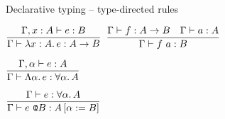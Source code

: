 \documentclass{beamer}
\begin{document}
\begin{frame}{Declarative typing -- type-directed rules}

\begin{center}
  $\displaystyle \frac{\Gamma, x : A \vdash e : B}{\Gamma \vdash \lambda x : A.\, e : A \to B} \textsc{\footnotesize{}}$ \quad
  $\displaystyle \frac{\Gamma \vdash f : A \to B \quad \Gamma \vdash a : A}{\Gamma \vdash f\ a : B} \textsc{\footnotesize{}}$

  \vspace{2em}

  $\displaystyle \frac{\Gamma, \alpha \vdash e : A}{\Gamma \vdash \Lambda \alpha.\, e : \forall \alpha.\, A} \textsc{\footnotesize{}}$

  \vspace{2em}

  $\displaystyle \frac{\Gamma \vdash e : \forall \alpha.\, A}{\Gamma \vdash e\ \texttt{@}B : A\left[\alpha := B\right]} \textsc{\footnotesize{}}$
\end{center}

\end{frame}
\end{document}
